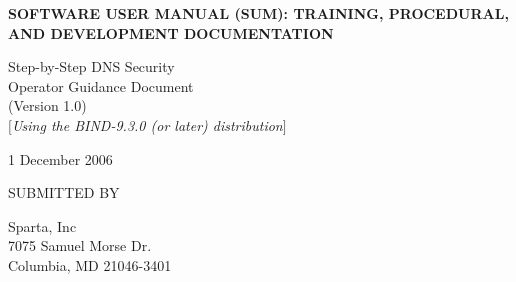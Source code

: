 \documentclass[12pt]{article}
\begin{document}

\begin{titlepage}

\vspace{.5in}

\begin{center}
\LARGE{\bf
SOFTWARE USER MANUAL (SUM):
TRAINING, PROCEDURAL, AND
DEVELOPMENT DOCUMENTATION
}
\vspace{.5in}

\Large{
Step-by-Step DNS Security\\
Operator Guidance Document\\
(Version 1.0)}\\
$[${\it Using the BIND-9.3.0 (or later) distribution}$]$
\vspace{0.5in}

% 
\vspace{2in}
1 December 2006
\end{center}

\vspace{.5in}

SUBMITTED BY

Sparta, Inc\\
7075 Samuel Morse Dr.\\
Columbia, MD 21046-3401
\vspace{0.25in}


\end{titlepage}

\end{document}
